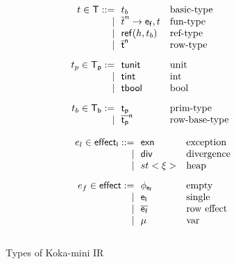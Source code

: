 \begin{figure}[H]
		\small
		\begin{minipage}[t]{.55\columnwidth}
			\[\begin{array}{@{}r@{\ \ }l@{\quad}l}
				t  \in \kw{T} ::= & t_b                       & \mbox{basic-type}\\
				               \mid &  \funt t n {\kw{e_f}} t       & \mbox{fun-type} \\
				              \mid & \reft h {t_b}                 & \mbox{ref-type}\\
				              \mid &\kw{\overline{t}^{n}}         & \mbox{row-type}\\[2ex]                 
				t_p \in \kw{T_p} := & \kw{tunit}        & \mbox{unit}\\
				                     \mid & \kw{tint}         & \mbox{int}\\
				                     \mid & \kw{tbool}        & \mbox{bool}\\[2ex]
			       t_b \in \kw{T_b} := & \kw{t_p}        & \mbox{prim-type}\\
				                     \mid & \kw{\overline{t_p}^{n}}         & \mbox{row-base-type}\\               
			
			\end{array}\]
		\end{minipage}%
		\begin{minipage}[t]{.70\columnwidth}
			\[\begin{array}{r@{\ \ }l@{\quad}l}
				e_l \in \effectlabel ::= & \kw{exn} & \mbox{exception}\\
				               \mid & \kw{div}   & \mbox{divergence}\\
				               \mid & \hid{\xi} & \mbox{heap}\\[2ex]
				e_f \in \kw{effect} := & \kw{\phi_{e_f}} & \mbox{empty} \\
				                      \mid & \kw{e_l} & \mbox{single}\\
				                      \mid & \kw{\overline{e_f}}  & \mbox{row effect}\\
				                      \mid & \eid & \mbox{var}     \\[2ex]
				
			\end{array}\]
		\end{minipage}
		
	\caption{Types of Koka-mini IR}\label{fig:koka-mini-types}
\end{figure}


